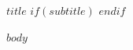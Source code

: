 \documentclass[11pt]{article}
\newlength{\gridunit}
\begin{document}
{\fontsize{14pt}{10mm}\selectfont\bfseries\color{body} $title$}%
$if(subtitle)$
%
$endif$
\par\vspace{\gridunit}

{\fontsize{10pt}{\gridunit}\selectfont
$body$
}
\end{document}

